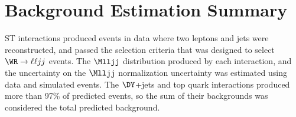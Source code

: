 \section{Background Estimation Summary}
ST interactions produced events in data where two leptons and jets were reconstructed, and passed the selection criteria that was 
designed to select $\WR \rightarrow \ell\ell jj$ events.  The $\Mlljj$ distribution produced by each interaction, and the uncertainty on 
the $\Mlljj$ normalization uncertainty was estimated using data and simulated events.  The $\DY$+jets and top quark interactions produced 
more than 97\% of predicted events, so the sum of their backgrounds was considered the total predicted background.


